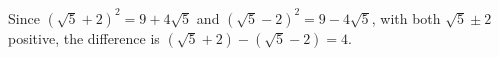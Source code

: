 Since $(\sqrt5+2)^2=9+4\sqrt5$ and $(\sqrt5-2)^2=9-4\sqrt5$, with both $\sqrt5\pm2$ positive, the difference is $(\sqrt5+2)-(\sqrt5-2)=\boxed4$.

